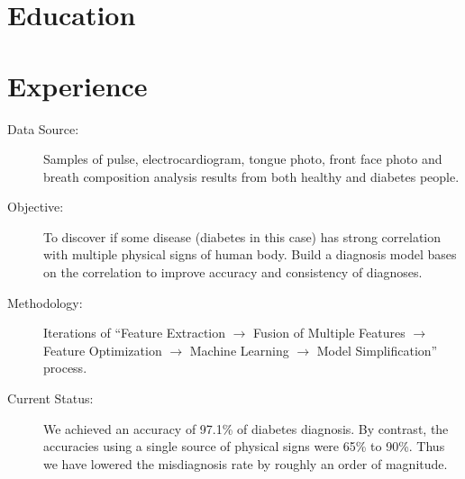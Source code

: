 \documentclass[10pt,a4paper]{moderncv/moderncv}
\begin{document}
\maketitle

\section{Education}


\section{Experience}
{
\begin{description}
	\item[Data Source:] Samples of pulse, electrocardiogram, tongue photo, front face photo and breath composition analysis results from both healthy and diabetes people.
	\item[Objective:] To discover if some disease (diabetes in this case) has strong correlation with multiple physical signs of human body. Build a diagnosis model bases on the correlation to improve accuracy and consistency of diagnoses.
	\item[Methodology:] Iterations of ``Feature Extraction $\rightarrow$ Fusion of Multiple Features $\rightarrow$ Feature Optimization $\rightarrow$ Machine Learning $\rightarrow$ Model Simplification'' process.
	\item[Current Status:]  We achieved an accuracy of 97.1\% of diabetes diagnosis. By contrast, the accuracies using a single source of physical signs were 65\% to 90\%. Thus we have lowered the misdiagnosis rate by roughly an order of magnitude.
\end{description}
}
\end{document}
